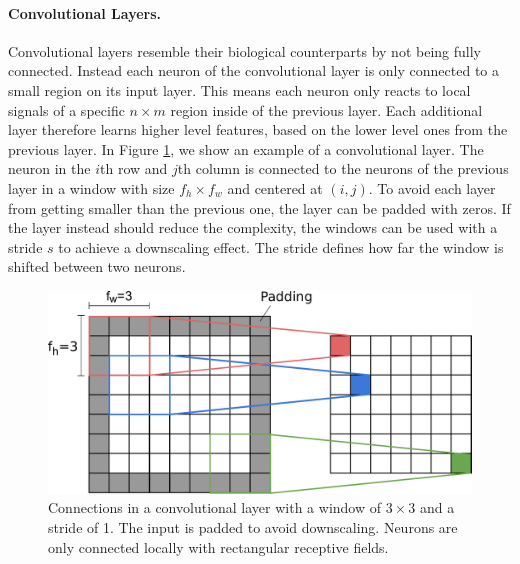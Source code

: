\paragraph{Convolutional Layers.} Convolutional layers resemble their biological counterparts by not being fully connected. Instead each neuron of the convolutional layer is only connected to a small region on its input layer. This means each neuron only reacts to local signals of a specific $n \times m$ region inside of the previous layer. Each additional layer therefore learns higher level features, based on the lower level ones from the previous layer. In Figure \ref{fig:ConvolutionalConnections}, we show an example of a convolutional layer. The neuron in the $i$th row and $j$th column is connected to the neurons of the previous layer in a window with size $f_h \times f_w$ and centered at $(i, j)$. To avoid each layer from getting smaller than the previous one, the layer can be padded with zeros. If the layer instead should reduce the complexity, the windows can be used with a stride $s$ to achieve a downscaling effect. The stride defines how far the window is shifted between two neurons.  

\begin{figure}[ht]
    
  \begin{center}
      \includegraphics[clip, width=0.7\columnwidth]{figures/deeplearning/Convolution.pdf}
  \end{center}
  
  \caption[Convolutional Connections]{Connections in a convolutional layer with a window of $3 \times 3$ and a stride of 1. The input is padded to avoid downscaling. Neurons are only connected locally with rectangular receptive fields.}
  \label{fig:ConvolutionalConnections}
\end{figure}


